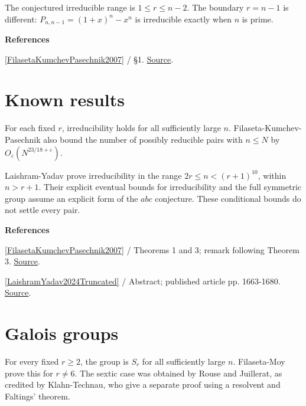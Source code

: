 \documentclass[11pt,a4paper,oneside,openany]{book}
\newcommand{\atlasdisplay}[1]{\par\begingroup\centering\vspace{3pt}\noindent\adjustbox{max width=\linewidth}{\(\displaystyle #1\)}\par\vspace{5pt}\endgroup}
\newenvironment{sources}{\par\smallskip\begingroup\footnotesize\color{atlasgray}\leftskip=10pt\setlength{\parskip}{2pt}}{\par\endgroup\smallskip}
\begin{document}
\atlasdisplay{P_{n,r}(x)=\sum_{j=0}^{r}\binom njx^j.}
\color{black} The conjectured irreducible range is \(1\le r\le n-2\). The boundary \(r=n-1\) is different: \(P_{n,n-1}=(1+x)^n-x^n\) is irreducible exactly when \(n\) is prime.\par
\begin{sources}
\textbf{References}\par\smallskip
\noindent\hyperlink{ref:FilasetaKumchevPasechnik2007}{[FilasetaKumchevPasechnik2007]} / §1.  \href{https://doi.org/10.1216/rmjm/1181068761}{Source}.\par
\end{sources}\color{black}
\section{Known results}
\color{black} For each fixed \(r\), irreducibility holds for all sufficiently large \(n\). Filaseta-Kumchev-Pasechnik also bound the number of possibly reducible pairs with \(n\le N\) by \(O_\varepsilon(N^{23/18+\varepsilon})\).\par
\color{black} Laishram-Yadav prove irreducibility in the range \(2r\le n<(r+1)^{10}\), within \(n>r+1\). Their explicit eventual bounds for irreducibility and the full symmetric group assume an explicit form of the \(abc\) conjecture. These conditional bounds do not settle every pair.\par
\begin{sources}
\textbf{References}\par\smallskip
\noindent\hyperlink{ref:FilasetaKumchevPasechnik2007}{[FilasetaKumchevPasechnik2007]} / Theorems 1 and 3; remark following Theorem 3.  \href{https://doi.org/10.1216/rmjm/1181068761}{Source}.\par
\noindent\hyperlink{ref:LaishramYadav2024Truncated}{[LaishramYadav2024Truncated]} / Abstract; published article pp. 1663-1680.  \href{https://doi.org/10.1142/S1793042124500817}{Source}.\par
\end{sources}\color{black}
\section{Galois groups}
\color{black} For every fixed \(r\ge2\), the group is \(S_r\) for all sufficiently large \(n\). Filaseta-Moy prove this for \(r\ne6\). The sextic case was obtained by Rouse and Juillerat, as credited by Klahn-Technau, who give a separate proof using a resolvent and Faltings' theorem.\par
\end{document}
